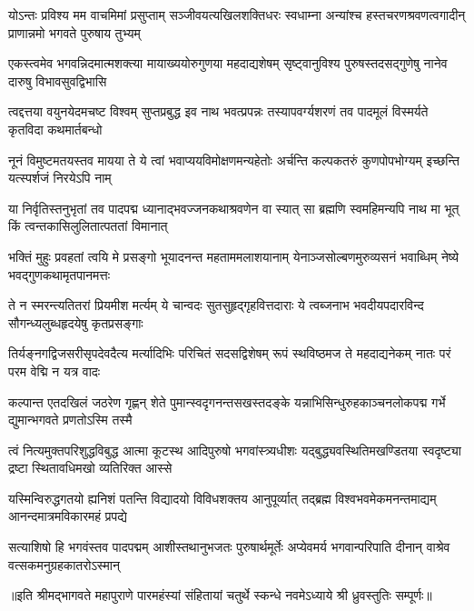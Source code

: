 
\fourlineindentedshloka
{योऽन्तः प्रविश्य मम वाचमिमां प्रसुप्ताम्}
{सञ्जीवयत्यखिलशक्तिधरः स्वधाम्ना}
{अन्यांश्च हस्तचरणश्रवणत्वगादीन्}
{प्राणान्नमो भगवते पुरुषाय तुभ्यम्}

\fourlineindentedshloka
{एकस्त्वमेव भगवन्निदमात्मशक्त्या}
{मायाख्ययोरुगुणया महदाद्यशेषम्}
{सृष्ट्वानुविश्य पुरुषस्तदसद्गुणेषु}
{नानेव दारुषु विभावसुवद्विभासि}

\fourlineindentedshloka
{त्वद्दत्तया वयुनयेदमचष्ट विश्वम्}
{सुप्तप्रबुद्ध इव नाथ भवत्प्रपन्नः}
{तस्यापवर्ग्यशरणं तव पादमूलं}
{विस्मर्यते कृतविदा कथमार्तबन्धो}

\fourlineindentedshloka
{नूनं विमुष्टमतयस्तव मायया ते}
{ये त्वां भवाप्ययविमोक्षणमन्यहेतोः}
{अर्चन्ति कल्पकतरुं कुणपोपभोग्यम्}
{इच्छन्ति यत्स्पर्शजं निरयेऽपि नाम्}

\fourlineindentedshloka
{या निर्वृतिस्तनुभृतां तव पादपद्म}
{ध्यानाद्भवज्जनकथाश्रवणेन वा स्यात्}
{सा ब्रह्मणि स्वमहिमन्यपि नाथ मा भूत्}
{किं त्वन्तकासिलुलितात्पततां विमानात्}

\fourlineindentedshloka
{भक्तिं मुहुः प्रवहतां त्वयि मे प्रसङ्गो}
{भूयादनन्त महताममलाशयानाम्}
{येनाञ्जसोल्बणमुरुव्यसनं भवाब्धिम्}
{नेष्ये भवद्गुणकथामृतपानमत्तः}

\fourlineindentedshloka
{ते न स्मरन्त्यतितरां प्रियमीश मर्त्यम्}
{ये चान्वदः सुतसुहृद्गृहवित्तदाराः}
{ये त्वब्जनाभ भवदीयपदारविन्द}
{सौगन्ध्यलुब्धहृदयेषु कृतप्रसङ्गाः}

\fourlineindentedshloka
{तिर्यङ्नगद्विजसरीसृपदेवदैत्य}
{मर्त्यादिभिः परिचितं सदसद्विशेषम्}
{रूपं स्थविष्ठमज ते महदाद्यनेकम्}
{नातः परं परम वेद्मि न यत्र वादः}

\fourlineindentedshloka
{कल्पान्त एतदखिलं जठरेण गृह्णन्}
{शेते पुमान्स्वदृगनन्तसखस्तदङ्के}
{यन्नाभिसिन्धुरुहकाञ्चनलोकपद्म}
{गर्भे द्युमान्भगवते प्रणतोऽस्मि तस्मै}

\fourlineindentedshloka
{त्वं नित्यमुक्तपरिशुद्धविबुद्ध आत्मा}
{कूटस्थ आदिपुरुषो भगवांस्त्र्यधीशः}
{यद्बुद्ध्यवस्थितिमखण्डितया स्वदृष्ट्या}
{द्रष्टा स्थितावधिमखो व्यतिरिक्त आस्से}

\fourlineindentedshloka
{यस्मिन्विरुद्धगतयो ह्यनिशं पतन्ति}
{विद्यादयो विविधशक्तय आनुपूर्व्यात्}
{तद्ब्रह्म विश्वभवमेकमनन्तमाद्यम्}
{आनन्दमात्रमविकारमहं प्रपद्ये}

\fourlineindentedshloka
{सत्याशिषो हि भगवंस्तव पादपद्मम्}
{आशीस्तथानुभजतः पुरुषार्थमूर्तेः}
{अप्येवमर्य भगवान्परिपाति दीनान्}
{वाश्रेव वत्सकमनुग्रहकातरोऽस्मान्}

{॥इति श्रीमद्भागवते महापुराणे पारमहंस्यां संहितायां चतुर्थे स्कन्धे नवमेऽध्याये श्री ध्रुवस्तुतिः सम्पूर्णः॥}
